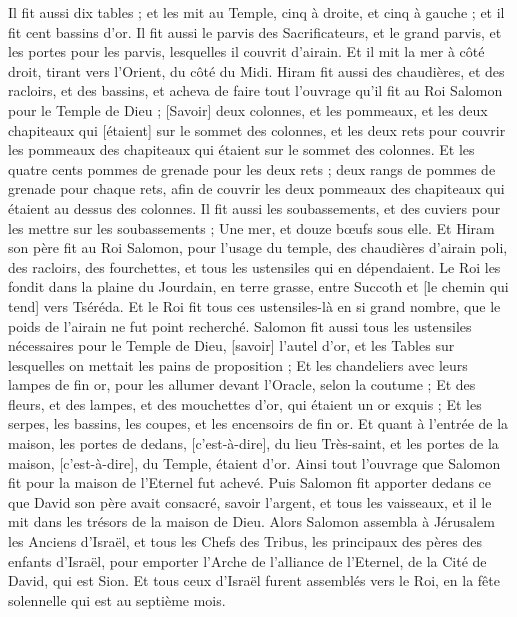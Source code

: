 \begin{multicols}{2}
Il fit aussi dix tables ; et les mit au Temple, cinq à droite, et cinq à gauche ; et il fit cent bassins d'or.
Il fit aussi le parvis des Sacrificateurs, et le grand parvis, et les portes pour les parvis, lesquelles il couvrit d'airain.
Et il mit la mer à côté droit, tirant vers l'Orient, du côté du Midi.
Hiram fit aussi des chaudières, et des racloirs, et des bassins, et acheva de faire tout l'ouvrage qu'il fit au Roi Salomon pour le Temple de Dieu ;
[Savoir] deux colonnes, et les pommeaux, et les deux chapiteaux qui [étaient] sur le sommet des colonnes, et les deux rets pour couvrir les pommeaux des chapiteaux qui étaient sur le sommet des colonnes.
Et les quatre cents pommes de grenade pour les deux rets ; deux rangs de pommes de grenade pour chaque rets, afin de couvrir les deux pommeaux des chapiteaux qui étaient au dessus des colonnes.
Il fit aussi les soubassements, et des cuviers pour les mettre sur les soubassements ;
Une mer, et douze bœufs sous elle.
Et Hiram son père fit au Roi Salomon, pour l'usage du temple, des chaudières d'airain poli, des racloirs, des fourchettes, et tous les ustensiles qui en dépendaient.
Le Roi les fondit dans la plaine du Jourdain, en terre grasse, entre Succoth et [le chemin qui tend] vers Tséréda.
Et le Roi fit tous ces ustensiles-là en si grand nombre, que le poids de l'airain ne fut point recherché.
Salomon fit aussi tous les ustensiles nécessaires pour le Temple de Dieu, [savoir] l'autel d'or, et les Tables sur lesquelles on mettait les pains de proposition ;
Et les chandeliers avec leurs lampes de fin or, pour les allumer devant l'Oracle, selon la coutume ;
Et des fleurs, et des lampes, et des mouchettes d'or, qui étaient un or exquis ;
Et les serpes, les bassins, les coupes, et les encensoirs de fin or. Et quant à l'entrée de la maison, les portes de dedans, [c'est-à-dire], du lieu Très-saint, et les portes de la maison, [c'est-à-dire], du Temple, étaient d'or.
\VerseOne{}Ainsi tout l'ouvrage que Salomon fit pour la maison de l'Eternel fut achevé. Puis Salomon fit apporter dedans ce que David son père avait consacré, savoir l'argent, et tous les vaisseaux, et il le mit dans les trésors de la maison de Dieu.
Alors Salomon assembla à Jérusalem les Anciens d'Israël, et tous les Chefs des Tribus, les principaux des pères des enfants d'Israël, pour emporter l'Arche de l'alliance de l'Eternel, de la Cité de David, qui est Sion.
Et tous ceux d'Israël furent assemblés vers le Roi, en la fête solennelle qui est au septième mois.

\end{multicols}
